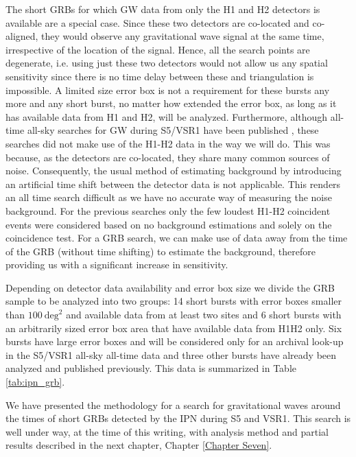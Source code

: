 The short GRBs for which GW data from only the H1 and H2 detectors is available are a special case.  Since these two detectors are co-located and co-aligned, they would observe any gravitational wave signal at the same time, irrespective of the location of the signal. Hence, all the search points are degenerate, i.e. using just these two detectors would not allow us any spatial sensitivity since there is no time delay between these and triangulation is impossible. A limited size error box is not a requirement for these bursts any more and any short burst, no matter how extended the error box, as long as it has available data from H1 and H2, will be analyzed. Furthermore, although all-time all-sky searches for GW during S5/VSR1 have been published \cite{Abadie:2010yba, Abbott:2009dk}, these searches did not make use of the H1-H2 data in the way we will do.  This was because, as the detectors are co-located, they share many common sources of noise.  Consequently, the usual method of estimating background by introducing an artificial time shift between the detector data is not applicable.  This renders an all time search difficult as we have no accurate way of measuring the noise background.  For the previous searches only the few loudest H1-H2 coincident events were considered based on no background estimations and solely on the coincidence test. For a GRB search, we can make use of data away from the time of the GRB (without time shifting) to estimate the background, therefore providing us with a significant increase in sensitivity.

Depending on detector data availability and error box size we divide the GRB sample to be analyzed into two groups: 14 short bursts with error boxes smaller than $100~\mathrm{deg}^2$ and available data from at least two sites and 6 short bursts with an arbitrarily sized error box area that have available data from H1H2 only. Six bursts have large error boxes and will be considered only for an archival look-up in the S5/VSR1 all-sky all-time data and three other bursts have already been analyzed and published previously. This data is summarized in Table \ref{tab:ipn_grb}.

\vspace{1cm}

We have presented the methodology for a search for gravitational waves around the times of short GRBs detected by the IPN during S5 and VSR1. This search is well under way, at the time of this writing, with analysis method and partial results described in the next chapter, Chapter \ref{Chapter Seven}.

